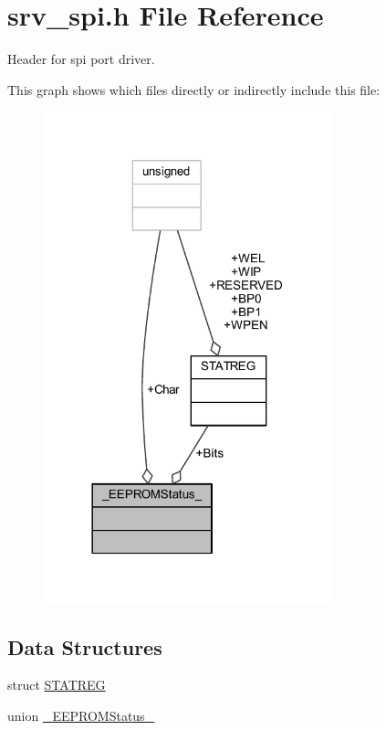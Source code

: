 \hypertarget{a00011}{\section{srv\+\_\+spi.\+h File Reference}
\label{a00011}
}


Header for spi port driver.  


This graph shows which files directly or indirectly include this file\+:\nopagebreak
\begin{figure}[H]
\begin{center}
\leavevmode
\includegraphics[width=237pt]{d4/d8e/a01694}
\end{center}
\end{figure}
\subsection*{Data Structures}
\begin{DoxyCompactItemize}
\item 
struct \hyperlink{a00011_d8/d7f/a00787}{S\+T\+A\+T\+R\+E\+G}
\item 
union \hyperlink{a00011_db/db6/a00074}{\+\_\+\+E\+E\+P\+R\+O\+M\+Status\+\_\+}
\end{DoxyCompactItemize}

